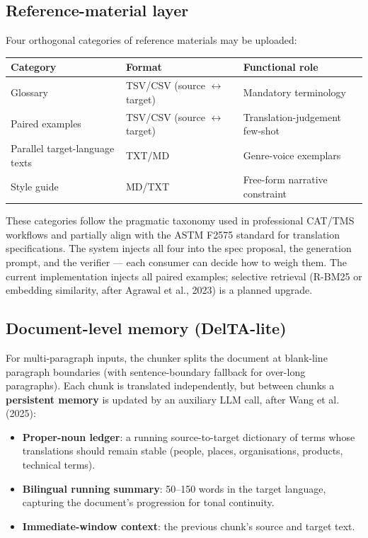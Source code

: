 \documentclass[11pt]{article}
\begin{document}
\subsection{Reference-material layer}

Four orthogonal categories of reference materials may be uploaded:

\begin{center}
\begin{tabular}{p{3.2cm} p{4.2cm} p{5.2cm}}
\hline
\textbf{Category} & \textbf{Format} & \textbf{Functional role} \\
\hline
Glossary & TSV/CSV (source $\leftrightarrow$ target) & Mandatory terminology \\
Paired examples & TSV/CSV (source $\leftrightarrow$ target) & Translation-judgement few-shot \\
Parallel target-language texts & TXT/MD & Genre-voice exemplars \\
Style guide & MD/TXT & Free-form narrative constraint \\
\hline
\end{tabular}
\end{center}

These categories follow the pragmatic taxonomy used in professional CAT/TMS workflows and partially align with the ASTM F2575 standard for translation specifications. The system injects all four into the spec proposal, the generation prompt, and the verifier --- each consumer can decide how to weigh them. The current implementation injects all paired examples; selective retrieval (R-BM25 or embedding similarity, after Agrawal et al., 2023) is a planned upgrade.

\subsection{Document-level memory (DelTA-lite)}

For multi-paragraph inputs, the chunker splits the document at blank-line paragraph boundaries (with sentence-boundary fallback for over-long paragraphs). Each chunk is translated independently, but between chunks a \textbf{persistent memory} is updated by an auxiliary LLM call, after Wang et al. (2025):

\begin{itemize}[leftmargin=*]
\item \textbf{Proper-noun ledger}: a running source-to-target dictionary of terms whose translations should remain stable (people, places, organisations, products, technical terms).
\item \textbf{Bilingual running summary}: 50--150 words in the target language, capturing the document's progression for tonal continuity.
\item \textbf{Immediate-window context}: the previous chunk's source and target text.
\end{itemize}
\end{document}

